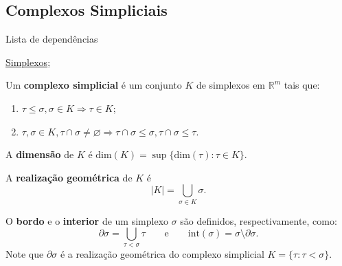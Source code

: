 \subsection{Complexos Simpliciais}
\label{complexo-simplicial-def}
\begin{titlemize}{Lista de dependências}
	\item \hyperref[simplexo-def]{Simplexos};\\ %
\end{titlemize}

\begin{defi}
    Um \textbf{complexo simplicial} é um conjunto $K$ de simplexos em $\mathbb{R}^m$ tais que:
    \begin{enumerate}
        \item $\tau \leq \sigma, \sigma \in K \Rightarrow \tau \in K$;
        \item $\tau,\sigma \in K, \tau \cap \sigma \neq \varnothing \Rightarrow \tau \cap \sigma \leq \sigma, \tau \cap \sigma \leq \tau$.
    \end{enumerate}

    A \textbf{dimensão} de $K$ é $\text{dim}(K) = \sup\{\text{dim}(\tau): \tau \in K\}$.

    A \textbf{realização geométrica} de $K$ é
    \[|K| = \bigcup_{\sigma \in K} \sigma.\]
\end{defi}

\begin{defi}
    O \textbf{bordo} e o \textbf{interior} de um simplexo $\sigma$ são definidos, respectivamente, como:
    \[\partial \sigma = \bigcup_{\tau < \sigma}\tau \qquad\text{e}\qquad \text{int}(\sigma) = \sigma \setminus \partial \sigma.\]
    Note que $\partial \sigma$ é a realização geométrica do complexo simplicial $K = \{\tau : \tau < \sigma\}$.
\end{defi}


